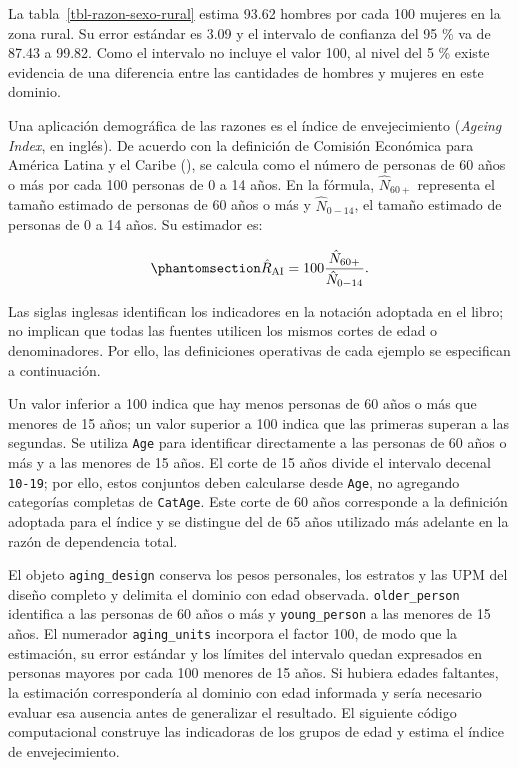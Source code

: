 \documentclass[
  spanish,
  11pt,
  letterpaper,
  oneside,
  open=any]{scrbook}
\begin{document}
La tabla~\ref{tbl-razon-sexo-rural} estima 93.62 hombres por cada 100
mujeres en la zona rural. Su error estándar es 3.09 y el intervalo de
confianza del 95 \% va de 87.43 a 99.82. Como el intervalo no incluye el
valor 100, al nivel del 5 \% existe evidencia de una diferencia entre
las cantidades de hombres y mujeres en este dominio.

Una aplicación demográfica de las razones es el índice de envejecimiento
(\emph{Ageing Index}, en inglés). De acuerdo con la definición de
Comisión Económica para América Latina y el Caribe
(), se calcula como
el número de personas de 60 años o más por cada 100 personas de 0 a 14
años. En la fórmula, \(\hat N_{60+}\) representa el tamaño estimado de
personas de 60 años o más y \(\hat N_{0-14}\), el tamaño estimado de
personas de 0 a 14 años. Su estimador es:

\begin{equation}\protect\phantomsection\label{eq-indice-envejecimiento}{
\hat R_{\mathrm{AI}}
=
100\frac{\hat N_{60+}}{\hat N_{0-14}}.
}\end{equation}

Las siglas inglesas identifican los indicadores en la notación adoptada
en el libro; no implican que todas las fuentes utilicen los mismos
cortes de edad o denominadores. Por ello, las definiciones operativas de
cada ejemplo se especifican a continuación.

Un valor inferior a 100 indica que hay menos personas de 60 años o más
que menores de 15 años; un valor superior a 100 indica que las primeras
superan a las segundas. Se utiliza \texttt{Age} para identificar
directamente a las personas de 60 años o más y a las menores de 15 años.
El corte de 15 años divide el intervalo decenal \texttt{10-19}; por
ello, estos conjuntos deben calcularse desde \texttt{Age}, no agregando
categorías completas de \texttt{CatAge}. Este corte de 60 años
corresponde a la definición adoptada para el índice y se distingue del
de 65 años utilizado más adelante en la razón de dependencia total.

El objeto \texttt{aging\_design} conserva los pesos personales, los
estratos y las UPM del diseño completo y delimita el dominio con edad
observada. \texttt{older\_person} identifica a las personas de 60 años o
más y \texttt{young\_person} a las menores de 15 años. El numerador
\texttt{aging\_units} incorpora el factor 100, de modo que la
estimación, su error estándar y los límites del intervalo quedan
expresados en personas mayores por cada 100 menores de 15 años. Si
hubiera edades faltantes, la estimación correspondería al dominio con
edad informada y sería necesario evaluar esa ausencia antes de
generalizar el resultado. El siguiente código computacional construye
las indicadoras de los grupos de edad y estima el índice de
envejecimiento.
\end{document}
